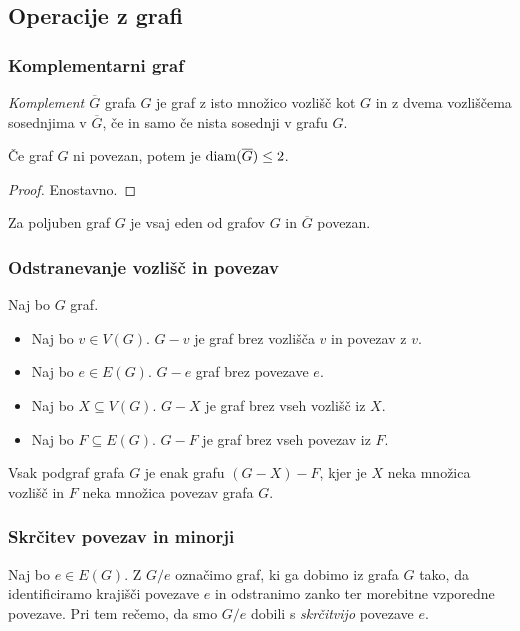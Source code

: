 \subsection{Operacije z grafi}
\subsubsection*{Komplementarni graf}
\begin{definicija}
    \emph{Komplement $\overline{G}$} grafa $G$ je graf z isto množico vozlišč kot $G$ in z dvema vozliščema sosednjima v $\overline{G}$, če in samo če nista sosednji v grafu $G$.
\end{definicija}

\begin{trditev}
    Če graf $G$ ni povezan, potem je $\operatorname{diam}(\overline{G}) \leq 2$.
\end{trditev}

\begin{proof}
    Enostavno.
\end{proof}

\begin{posledica}
    Za poljuben graf $G$ je vsaj eden od grafov $G$ in $\overline{G}$ povezan.
\end{posledica}

\subsubsection*{Odstranevanje vozlišč in povezav}
Naj bo $G$ graf.
\begin{itemize}
    \item Naj bo $v \in V(G)$. $G - v$ je graf brez vozlišča $v$ in povezav z $v$.
    \item Naj bo $e \in E(G)$. $G - e$ graf brez povezave $e$.
    \item Naj bo $X \subseteq V(G)$. $G - X$ je graf brez vseh vozlišč iz $X$.
    \item Naj bo $F \subseteq E(G)$. $G-F$ je graf brez vseh povezav iz $F$.
\end{itemize}

\begin{opomba}
    Vsak podgraf grafa $G$ je enak grafu $(G-X)-F$, kjer je $X$ neka množica vozlišč in $F$ neka množica povezav grafa $G$.
\end{opomba}

\subsubsection*{Skrčitev povezav in minorji}
Naj bo $e \in E(G)$. Z $G/e$ označimo graf, ki ga dobimo iz grafa $G$ tako, da identificiramo krajišči povezave $e$ in odstranimo zanko ter morebitne vzporedne povezave. Pri tem rečemo, da smo $G / e$ dobili s \emph{skrčitvijo} povezave $e$.

